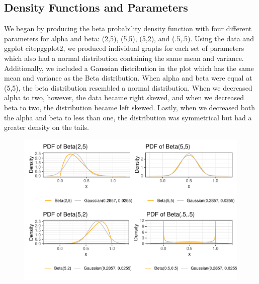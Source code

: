 \documentclass{article}\usepackage[]{graphicx}\usepackage[]{xcolor}
\begin{document}
\begin{multicols}{2}
\section{Density Functions and Parameters}
  We began by producing the beta probability density function with four different parameters for alpha and beta: (2,5), (5,5), (5,2), and (.5,.5). Using the data and ggplot citep{ggplot2}, we produced individual graphs for each set of parameters which also had a normal distribution containing the same mean and variance. Additionally, we included a Gaussian distribution in the plot which has the same mean and variance as the Beta distribution. When alpha and beta were equal at (5,5), the beta distribution resembled a normal distribution. When we decreased alpha to two, however, the data became right skewed, and when we decreased beta to two, the distribution became left skewed. Lastly, when we decreased both the alpha and beta to less than one, the distribution was symmetrical but had a greater density on the tails. 
  
  
   \begin{figure}[H]
    \begin{center}
       \includegraphics[scale=0.5]{densityf.pdf}
       \caption{}
     \label{densityf}
     \end{center}
   \end{figure}




\end{multicols}
\end{document}
